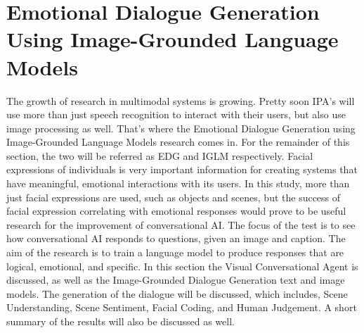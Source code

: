\documentclass[letterpaper, 10 pt, conference]{IEEEtran}
\begin{document}
\section{Emotional Dialogue Generation Using Image-Grounded Language Models}
The growth of research in multimodal systems is growing. Pretty soon IPA's will use more than just speech recognition to interact with their users, but also use image processing as well. That's where the Emotional Dialogue Generation using Image-Grounded Language Models research comes in. For the remainder of this section, the two will be referred as EDG and IGLM respectively. Facial expressions of individuals is very important information for creating systems that have meaningful, emotional interactions with its users. In this study, more than just facial expressions are used, such as objects and scenes, but the success of facial expression correlating with emotional responses would prove to be useful research for the improvement of conversational AI. The focus of the test is to see how conversational AI responds to questions, given an image and caption. The aim of the research is to train a language model to produce responses that are logical, emotional, and specific. In this section the Visual Conversational Agent is discussed, as well as the Image-Grounded Dialogue Generation text and image models. The generation of the dialogue will be discussed, which includes, Scene Understanding, Scene Sentiment, Facial Coding, and Human Judgement. A short summary of the results will also be discussed as well.
\end{document}
